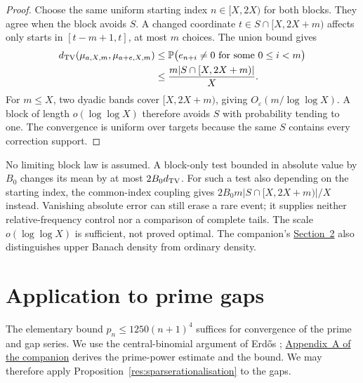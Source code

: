 \documentclass[11pt]{article}
\begin{document}
\begin{proof}
Choose the same uniform starting index $n\in[X,2X)$ for both
blocks.  They agree when the block avoids $S$.  A changed coordinate
$t\in S\cap[X,2X+m)$ affects only starts in $[t-m+1,t]$, at most
$m$ choices.  The union bound gives
\[
 \begin{aligned}
 d_{\rm TV}(\mu_{a,X,m},\mu_{a+e,X,m})
 &\le\mathbb P\bigl(e_{n+i}\ne0\text{ for some }0\le i<m\bigr)\\
 &\le\frac{m|S\cap[X,2X+m)|}{X}.
 \end{aligned}
\]
For $m\le X$, two dyadic bands cover $[X,2X+m)$, giving
$O_\varepsilon(m/\log\log X)$.  A block of length $o(\log\log X)$
therefore avoids $S$ with probability tending to one.  The convergence
is uniform over targets because the same $S$ contains every correction
support.

\end{proof}

No limiting block law is assumed.  A block-only test bounded in
absolute value by $B_0$ changes its mean by at most $2B_0d_{\rm TV}$.
For such a test also depending on the starting index, the common-index
coupling gives $2B_0m|S\cap[X,2X+m)|/X$ instead.
Vanishing absolute error can still erase a rare event; it supplies
neither relative-frequency control nor a comparison of complete tails.  The scale $o(\log\log X)$ is sufficient, not proved
optimal.  The companion's
\href{erdos251-prime-gap-reasoning-surface.pdf\#sparse-construction}{Section~2}
also distinguishes upper Banach density from ordinary density.

\section{Application to prime gaps}\label{sec:prime-application}
The elementary bound $p_n\le1250(n+1)^4$ suffices for convergence of
the prime and gap series.  We use the central-binomial argument of
Erd\H{o}s \cite[pp.~194--196]{erdos1932};
\href{erdos251-prime-gap-reasoning-surface.pdf\#prime-bound}{Appendix~A of the companion}
derives the prime-power estimate and the bound.  We may therefore apply
Proposition~\ref{res:sparserationalisation} to the gaps.
\end{document}
